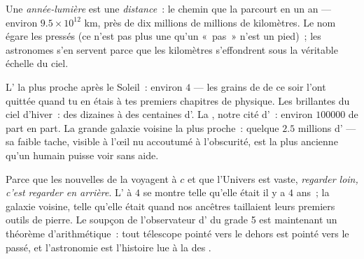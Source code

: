 \begin{definition}\label{def:g8:speed-of-light:lightyear}
Une \emph{année-lumière} est une
\emph{distance}~: le chemin que la  parcourt en un an ---
environ $9.5 \times 10^{12}$ km, près de dix millions de millions de
kilomètres. Le nom égare les pressés (ce n'est pas plus une 
qu'un «~pas~» n'est un pied)~; les astronomes s'en servent parce que
les kilomètres s'effondrent sous la véritable échelle du ciel.
\end{definition}

\begin{example}\label{ex:g8:speed-of-light:ladder}
L' la plus proche après le Soleil~: environ $4$
 --- les grains de  de ce soir l'ont quittée
quand tu en étais à tes premiers chapitres de physique. Les 
brillantes du ciel d'hiver~: des dizaines à des centaines
d'. La , notre cité d'~: environ
$100000$  de part en part. La grande galaxie voisine la
plus proche~: quelque $2.5$ millions d' --- sa faible
tache, visible à l'œil nu accoutumé à l'obscurité, est la plus
ancienne  qu'un humain puisse voir sans aide.
\end{example}

\begin{proposition}\label{prop:g8:speed-of-light:timemachine}
Parce que les nouvelles de la  voyagent à $c$ et que l'Univers
est vaste, \emph{regarder loin, c'est regarder en arrière}. L' à
$4$  se montre telle qu'elle était il y a $4$ ans~; la
galaxie voisine, telle qu'elle était quand nos ancêtres taillaient
leurs premiers outils de pierre. Le soupçon de l'observateur d'
du grade 5 est maintenant un théorème d'arithmétique~: tout télescope
pointé vers le dehors est pointé vers le passé, et l'astronomie est
l'histoire lue à la  des .
\end{proposition}

